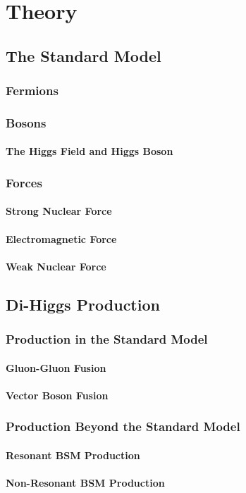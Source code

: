 \chapter{Theory}
    \section{The Standard Model}
        \subsection{Fermions}
        \subsection{Bosons}
            \subsubsection{The Higgs Field and Higgs Boson}
        \subsection{Forces}
            \subsubsection{Strong Nuclear Force}
            \subsubsection{Electromagnetic Force}
            \subsubsection{Weak Nuclear Force}

    \section{Di-Higgs Production}
        \subsection{Production in the Standard Model}
            \subsubsection{Gluon-Gluon Fusion}
            \subsubsection{Vector Boson Fusion}
        \subsection{Production Beyond the Standard Model}
            \subsubsection{Resonant BSM Production}
            \subsubsection{Non-Resonant BSM Production}
